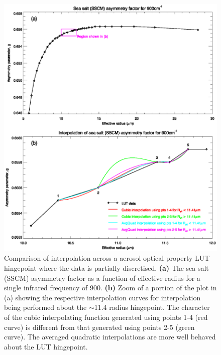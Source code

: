 \begin{figure}[htp]
  \centering
  \includegraphics[scale=0.8]{graphics/Aerosol/g.Reff.SSCM.900cm-1.eps}
  \caption{Comparison of interpolation across a aerosol optical property LUT hingepoint where the data is partially discretised. \textbf{(a)} The sea salt (SSCM) asymmetry factor as a function of effective radius for a single infrared frequency of 900\invcm. \textbf{(b)} Zoom of a portion of the plot in (a) showing the respective interpolation curves for interpolation being performed about the $\sim$11.4\micron{} radius hingepoint. The character of the cubic interpolating function generated using points 1-4 (red curve) is different from that generated using points 2-5 (green curve). The averaged quadratic interpolations are more well behaved about the LUT hingepoint.}
  \label{fig:g.Reff.SSCM.900cm-1}
\end{figure}
